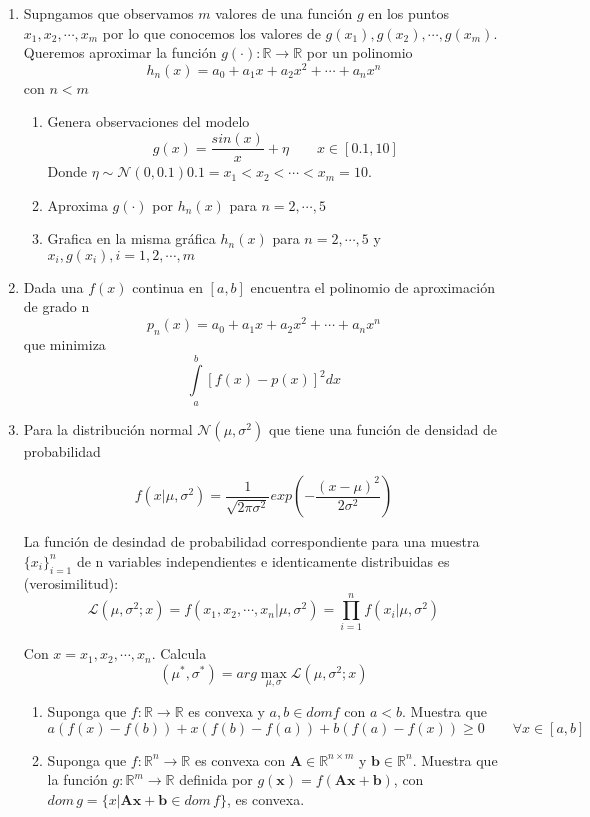 \documentclass{article}
\begin{document}
\begin{enumerate}
\begin{enumerate}
\end{enumerate}
\item Supngamos que observamos $m$ valores de una función $g$ en los puntos $x_1, x_2, \cdots , x_m$ por lo que conocemos los valores de $g(x_1), g(x_2), \cdots , g(x_m)$. Queremos aproximar la función $g(\cdot) : \mathbb{R} \rightarrow \mathbb{R}$ por un polinomio
$$h_n(x) = a_0 + a_1x + a_2x^2 + \cdots + a_nx^n$$
con $n < m$

\begin{enumerate}
  \item Genera observaciones del modelo
  $$g(x) = \frac{sin(x)}{x} + \eta \qquad x \in [0.1, 10]$$
  Donde $\eta \sim \mathcal{N}(0, 0.1) 0.1=x_1 <x_2 <\cdots<x_m =10.$
  \item Aproxima $g(\cdot)$ por $h_n(x)$ para $n = 2, \cdots, 5$
  \item Grafica en la misma gráfica $h_n(x)$ para $n = 2, \cdots, 5$ y ${x_i, g(x_i)}, i = 1, 2, \cdots, m$
\end{enumerate}

\newpage
\item Dada una $f(x)$ continua en $[a, b]$ encuentra el polinomio de aproximación de grado n 
$$p_n(x) = a_0 + a_1x + a_2x^2 + \cdots + a_nx^n$$
que minimiza
$$\int\limits_a^b[f(x) - p(x)]^2 dx$$

\item Para la distribución normal $\mathcal{N}(\mu, \sigma^2)$ que tiene una función de densidad de probabilidad 

$$f(x | \mu, \sigma^2) = \frac{1}{\sqrt{2\pi\sigma^2}}exp\left(-\frac{(x-\mu)^2}{2\sigma^2}\right)$$

La función de desindad de probabilidad correspondiente para una muestra $\{x_i\}_{i=1}^n$ de n variables independientes e identicamente distribuidas es (verosimilitud):
$$\mathcal{L}(\mu, \sigma^2; x) = f(x_1, x_2, \cdots, x_n | \mu,\sigma^2) = \prod_{i=1}^{n}f(x_i| \mu,\sigma^2)$$

Con $x = x_1, x_2, \cdots, x_n$. Calcula
$$(\mu^*, \sigma^*) = arg \max_{\mu, \sigma} \mathcal{L}(\mu, \sigma^2; x)$$
\begin{enumerate}
\item Suponga que $f : \mathbb{R} \rightarrow \mathbb{R}$ es convexa y $a, b \in dom f$ con $a < b$. Muestra que 
$$ a(f(x) - f(b)) + x(f(b) - f(a)) + b(f(a) - f(x)) \geq 0 \qquad \forall x \in [a, b]$$

\item Suponga que $f : \mathbb{R}^n \rightarrow \mathbb{R}$ es convexa con $\boldsymbol{A} \in \mathbb{R}^{n\times m}$ y $\boldsymbol{b} \in \mathbb{R}^n$. Muestra que la función $g: \mathbb{R}^m \rightarrow \mathbb{R}$ definida por $g(\boldsymbol{x}) = f(\boldsymbol{Ax}+\boldsymbol{b})$, con $dom \,g = \{x |\boldsymbol{Ax}+\boldsymbol{b} \in dom \,f\}$, es convexa.
\end{enumerate}

\end{enumerate}
\end{document}
